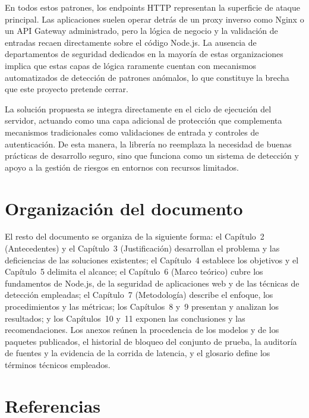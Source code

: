En todos estos patrones, los endpoints HTTP representan la superficie de ataque principal.
Las aplicaciones suelen operar detrás de un proxy inverso como Nginx o un API Gateway
administrado, pero la lógica de negocio y la validación de entradas recaen directamente
sobre el código Node.js. La ausencia de departamentos de seguridad dedicados en la mayoría
de estas organizaciones implica que estas capas de lógica raramente cuentan con mecanismos
automatizados de detección de patrones anómalos, lo que constituye la brecha que este
proyecto pretende cerrar.

La solución propuesta se integra directamente en el ciclo de ejecución del servidor,
actuando como una capa adicional de protección que complementa mecanismos tradicionales
como validaciones de entrada y controles de autenticación. De esta manera, la librería no
reemplaza la necesidad de buenas prácticas de desarrollo seguro, sino que funciona como un
sistema de detección y apoyo a la gestión de riesgos en entornos con recursos limitados.

\section*{Organización del documento}

El resto del documento se organiza de la siguiente forma: el Capítulo~2 (Antecedentes) y el
Capítulo~3 (Justificación) desarrollan el problema y las deficiencias de las soluciones existentes;
el Capítulo~4 establece los objetivos y el Capítulo~5 delimita el alcance; el Capítulo~6 (Marco
teórico) cubre los fundamentos de Node.js, de la seguridad de aplicaciones web y de las técnicas de
detección empleadas; el Capítulo~7 (Metodología) describe el enfoque, los procedimientos y las
métricas; los Capítulos~8 y~9 presentan y analizan los resultados; y los Capítulos~10 y~11 exponen las conclusiones y las recomendaciones. Los anexos reúnen la
procedencia de los modelos y de los paquetes publicados, el historial de bloqueo del conjunto de
prueba, la auditoría de fuentes y la evidencia de la corrida de latencia, y el glosario define los
términos técnicos empleados.

\ifdefined\modoensamble
\else
	\section*{Referencias}
	\printbibliography[heading=none]
	
\fi
